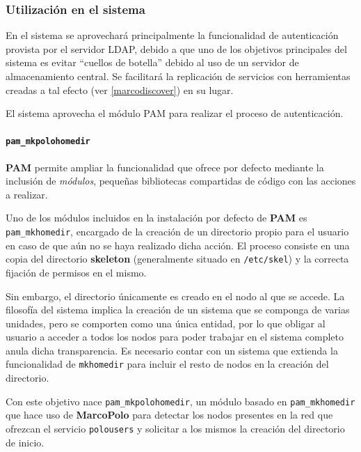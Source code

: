 \subsubsection{Utilización en el sistema}

En el sistema se aprovechará principalmente la funcionalidad de autenticación provista por el servidor LDAP, debido a que uno de los objetivos principales del sistema es evitar ``cuellos de botella'' debido al uso de un servidor de almacenamiento central. Se facilitará la replicación de servicios con herramientas creadas a tal efecto (ver \ref{marcodiscover}) en su lugar.%

El sistema aprovecha el módulo PAM para realizar el proceso de autenticación.

\paragraph{\texttt{pam\_mkpolohomedir}\\}
\label{pam_mkpolohomedir}

\textbf{PAM} permite ampliar la funcionalidad que ofrece por defecto mediante la inclusión de \textit{módulos}, pequeñas bibliotecas compartidas de código con las acciones a realizar.

Uno de los módulos incluidos en la instalación por defecto de \textbf{PAM} es \texttt{pam\_mkhomedir}, encargado de la creación de un directorio propio para el usuario en caso de que aún no se haya realizado dicha acción. El proceso consiste en una copia del directorio \textbf{skeleton} (generalmente situado en \texttt{/etc/skel}) y la correcta fijación de permisos en el mismo.

Sin embargo, el directorio únicamente es creado en el nodo al que se accede. La filosofía del sistema implica la creación de un sistema que se componga de varias unidades, pero se comporten como una única entidad, por lo que obligar al usuario a acceder a todos los nodos para poder trabajar en el sistema completo anula dicha transparencia. Es necesario contar con un sistema que extienda la funcionalidad de \texttt{mkhomedir} para incluir el resto de nodos en la creación del directorio.

Con este objetivo nace \texttt{pam\_mkpolohomedir}, un módulo basado en \texttt{pam\_mkhomedir} que hace uso de \textbf{MarcoPolo} para detectar los nodos presentes en la red que ofrezcan el servicio \texttt{polousers} y solicitar a los mismos la creación del directorio de inicio.

